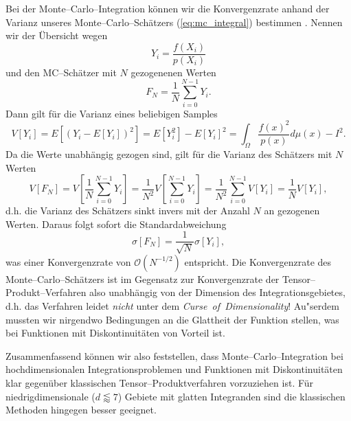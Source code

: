 	Bei der Monte--Carlo--Integration können wir die Konvergenzrate anhand der Varianz unseres Monte--Carlo--Schätzers (\ref{eq:mc_integral}) bestimmen \citep[][2.4.1]{Veach:1997p9136}. Nennen wir der Übersicht wegen
	$$Y_i=\frac{f(X_i)}{p(X_i)}$$
	und den MC--Schätzer mit $N$ gezogenenen Werten
	$$F_N=\frac{1}{N}\sum_{i=0}^{N-1} Y_i.$$
	Dann gilt für die Varianz eines beliebigen Samples
	\begin{equation}
		V[Y_i]=E[(Y_i-E[Y_i])^2]=E[Y_i^2]-E[Y_i]^2=\int_\Omega \frac{f(x)^2}{p(x)}d\mu(x)-I^2.
		\label{eq:mc_variance}
	\end{equation}
	Da die Werte unabhängig gezogen sind, gilt für die Varianz des Schätzers mit $N$ Werten
	$$V[F_N]=V\left[\frac{1}{N}\sum_{i=0}^{N-1}Y_i\right]=\frac{1}{N^2}V\left[\sum_{i=0}^{N-1}Y_i\right]=\frac{1}{N^2}\sum_{i=0}^{N-1}V[Y_i]=\frac{1}{N}V[Y_i],$$
	d.h. die Varianz des Schätzers sinkt invers mit der Anzahl $N$ an gezogenen Werten. Daraus folgt sofort die Standardabweichung
	\begin{equation}
		\sigma[F_N]=\frac{1}{\sqrt{N}}\sigma[Y_i],
		\label{eq:mc_standarddeviation}
	\end{equation}
	was einer Konvergenzrate von $\mathcal{O}(N^{-1/2})$ entspricht. Die Konvergenzrate des Mon\-te--Car\-lo--Schätzers ist im Gegensatz zur Konvergenzrate der Ten\-sor--Pro\-dukt--Ver\-fahr\-en also unabhängig von der Dimension des Integrationsgebietes, d.h. das Verfahren leidet {\em nicht} unter dem {\em Curse~of~Dimensionality}! Au"serdem mussten wir nirgendwo Bedingungen an die Glattheit der Funktion stellen, was bei Funktionen mit Diskontinuitäten von Vorteil ist.
	
	Zusammenfassend können wir also feststellen, dass Monte--Carlo--Integration bei hochdimensionalen Integrationsproblemen und Funktionen mit Diskontinuitäten klar gegenüber klassischen Tensor--Produktverfahren vorzuziehen ist. Für niedrigdimensionale ($d\lessapprox 7$) Gebiete mit glatten Integranden sind die klassischen Methoden hingegen besser geeignet.
	
	
